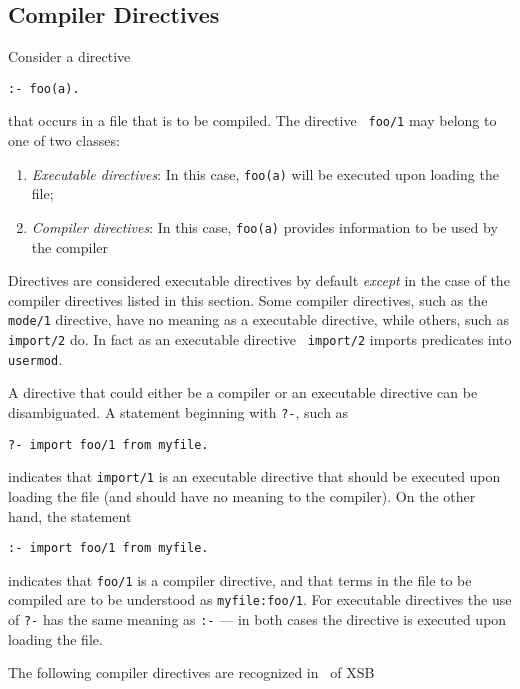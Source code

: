 \subsection{Compiler Directives}\label{compiler_directives}

Consider a directive
\begin{verbatim}
:- foo(a).
\end{verbatim}
that occurs in a file that is to be compiled.  The directive {\tt
  foo/1} may belong to one of two classes:
\begin{enumerate}
\item {\em Executable directives}: In this case, {\tt foo(a)} will be
  executed upon loading the file;
%
\item {\em Compiler directives}: In this case, {\tt foo(a)} provides
  information to be used by the compiler
\end{enumerate}

Directives are considered executable directives by default {\em
  except} in the case of the compiler directives listed in this
section.  Some compiler directives, such as the {\tt mode/1}
directive, have no meaning as a executable directive, while others,
such as {\tt import/2} do.  In fact as an executable directive {\tt
  import/2} imports predicates into {\tt usermod}.

A directive that could either be a compiler or an executable directive
can be disambiguated.  A statement beginning with {\tt ?-}, such as
\begin{verbatim}
?- import foo/1 from myfile.
\end{verbatim}
indicates that {\tt import/1} is an executable directive that should
be executed upon loading the file (and should have no meaning to the
compiler).  On the other hand, the statement
\begin{verbatim}
:- import foo/1 from myfile.
\end{verbatim}
indicates that {\tt foo/1} is a compiler directive, and that terms in
the file to be compiled are to be understood as {\tt myfile:foo/1}.
For executable directives the use of {\tt ?-} has the same meaning as
{\tt :-} --- in both cases the directive is executed upon loading the
file.

The following compiler directives are recognized in \version\ of XSB

